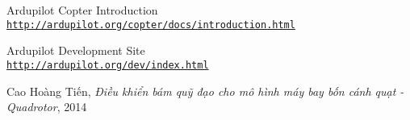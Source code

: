 \cleardoublepage
\renewcommand{\bibname}{Tài liệu tham khảo}
\begin{thebibliography}{80}

Ardupilot Copter Introduction
\\\texttt{\url{http://ardupilot.org/copter/docs/introduction.html}}

Ardupilot Development Site
\\\texttt{\url{http://ardupilot.org/dev/index.html}}

Cao Hoàng Tiến, \textit{Điều khiển bám quỹ đạo cho mô hình máy bay bốn cánh quạt - Quadrotor}, 2014

\end{thebibliography}

